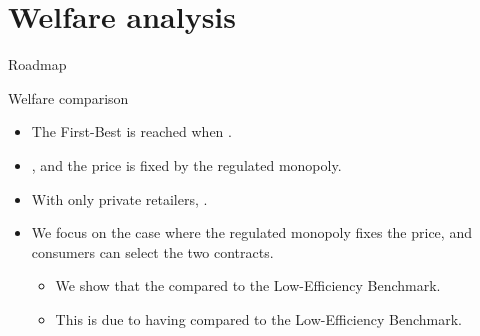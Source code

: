 \documentclass{class}
\begin{document}

\section{Welfare analysis}


\begin{frame}{Roadmap}
  \tableofcontents [sectionstyle=show/shaded,subsectionstyle=show/shaded]
\end{frame}


\begin{frame}{Welfare comparison}


\begin{itemize}
   
    \item The First-Best is reached when . \vfill

    \item {}, and the price is fixed by the regulated monopoly. \vfill

    \item With only private retailers, . \vfill

    \item We focus on the case where the regulated monopoly fixes the price, and consumers can select the two contracts. \vfill

    \begin{itemize}
        \item We show that the  compared to the Low-Efficiency Benchmark. \vfill
        \item This is due to having  compared to the Low-Efficiency Benchmark.
    \end{itemize}
    
\end{itemize}
    
\end{frame}
\end{document}
